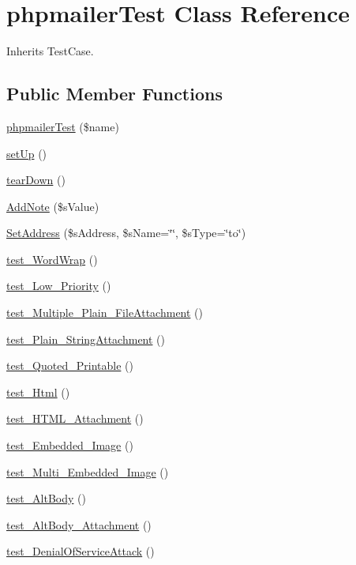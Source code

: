 \hypertarget{classphpmailerTest}{
\section{phpmailerTest Class Reference}
\label{classphpmailerTest}
}
Inherits TestCase.

\subsection*{Public Member Functions}
\begin{CompactItemize}
\item 
\hyperlink{classphpmailerTest_2c284d8272ed4f05ae06c2fe65c8240f}{phpmailerTest} (\$name)
\item 
\hyperlink{classphpmailerTest_5b3345868cb74b86eaa3cf986248e73a}{setUp} ()
\item 
\hyperlink{classphpmailerTest_3a302ac3c1b988c9cff8d9d505684f4b}{tearDown} ()
\item 
\hyperlink{classphpmailerTest_46261f975013e4c661063c79ba60b538}{AddNote} (\$sValue)
\item 
\hyperlink{classphpmailerTest_494e608fad377334ecbdd5f0b49eb094}{SetAddress} (\$sAddress, \$sName=\char`\"{}\char`\"{}, \$sType=\char`\"{}to\char`\"{})
\item 
\hyperlink{classphpmailerTest_3d736d9ad00be8d68d18c02a23ab6be2}{test\_\-WordWrap} ()
\item 
\hyperlink{classphpmailerTest_a2e3da7cf253b35a14e8ae83b88c13fd}{test\_\-Low\_\-Priority} ()
\item 
\hyperlink{classphpmailerTest_70b18cfe7255efd4c49aba3069f1930a}{test\_\-Multiple\_\-Plain\_\-FileAttachment} ()
\item 
\hyperlink{classphpmailerTest_95091807289adb9addf8194efccb3f5d}{test\_\-Plain\_\-StringAttachment} ()
\item 
\hyperlink{classphpmailerTest_2d776453f3ada9b55b077a499e6f2d91}{test\_\-Quoted\_\-Printable} ()
\item 
\hyperlink{classphpmailerTest_6cfde03f508f28f9cf68b127800ae799}{test\_\-Html} ()
\item 
\hyperlink{classphpmailerTest_3e39c323b9a15751108f6eeff848199c}{test\_\-HTML\_\-Attachment} ()
\item 
\hyperlink{classphpmailerTest_f9e53f9c6563e8435fcb1089ca3ef950}{test\_\-Embedded\_\-Image} ()
\item 
\hyperlink{classphpmailerTest_63912e1771f7eb477a8d539393d954d3}{test\_\-Multi\_\-Embedded\_\-Image} ()
\item 
\hyperlink{classphpmailerTest_3176773f378632c17dc95f4d6df2d42c}{test\_\-AltBody} ()
\item 
\hyperlink{classphpmailerTest_76332327e357d6a5c534cd21397e51e3}{test\_\-AltBody\_\-Attachment} ()
\item 
\hyperlink{classphpmailerTest_cb35f31f4260304f6f0771c61ab59992}{test\_\-DenialOfServiceAttack} ()
\end{CompactItemize}
